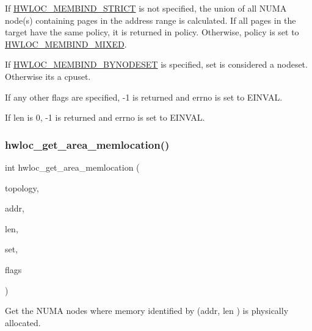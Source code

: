 If \hyperlink{a00191_ggab00475fd98815bf4fb9aaf752030e7d2a0335311a0ee04166df2888d52b4a42c6}{H\+W\+L\+O\+C\+\_\+\+M\+E\+M\+B\+I\+N\+D\+\_\+\+S\+T\+R\+I\+CT} is not specified, the union of all N\+U\+MA node(s) containing pages in the address range is calculated. If all pages in the target have the same policy, it is returned in {\ttfamily policy}. Otherwise, {\ttfamily policy} is set to \hyperlink{a00191_ggac9764f79505775d06407b40f5e4661e8a3185bd869b67817fb2bd5164bf360402}{H\+W\+L\+O\+C\+\_\+\+M\+E\+M\+B\+I\+N\+D\+\_\+\+M\+I\+X\+ED}.

If \hyperlink{a00191_ggab00475fd98815bf4fb9aaf752030e7d2a71f19fe4505f1c083dc8e6f7bdea6256}{H\+W\+L\+O\+C\+\_\+\+M\+E\+M\+B\+I\+N\+D\+\_\+\+B\+Y\+N\+O\+D\+E\+S\+ET} is specified, set is considered a nodeset. Otherwise it\textquotesingle{}s a cpuset.

If any other flags are specified, -\/1 is returned and errno is set to E\+I\+N\+V\+AL.

If {\ttfamily len} is 0, -\/1 is returned and errno is set to E\+I\+N\+V\+AL. \mbox{\label{a00191_ga537c7508a4e2d1db05673ec5be6e805c}} 
\subsubsection{\texorpdfstring{hwloc\+\_\+get\+\_\+area\+\_\+memlocation()}{hwloc\_get\_area\_memlocation()}}
{\footnotesize\ttfamily int hwloc\+\_\+get\+\_\+area\+\_\+memlocation (\begin{DoxyParamCaption}\item[{\hyperlink{a00186_ga9d1e76ee15a7dee158b786c30b6a6e38}{hwloc\+\_\+topology\+\_\+t}}]{topology,  }\item[{const void $\ast$}]{addr,  }\item[{size\+\_\+t}]{len,  }\item[{\hyperlink{a00205_gaa3c2bf4c776d603dcebbb61b0c923d84}{hwloc\+\_\+bitmap\+\_\+t}}]{set,  }\item[{int}]{flags }\end{DoxyParamCaption})}



Get the N\+U\+MA nodes where memory identified by ({\ttfamily addr}, {\ttfamily len} ) is physically allocated. 

